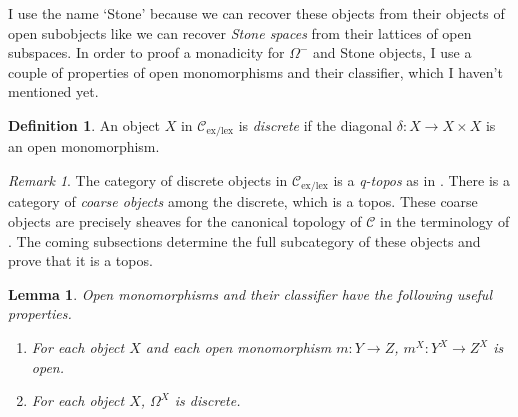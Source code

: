 \documentclass[sort&compress]{elsarticle}
\theoremstyle{plain}
\newtheorem{lemma}[theorem]{Lemma}
\theoremstyle{definition}
\newtheorem{defin}[theorem]{Definition}
\theoremstyle{remark}
\newtheorem{remark}[theorem]{Remark}
\newcommand\cat\mathcal
\newcommand\exlex{_\mathrm{ex/lex}}\newcommand\exreg{_\mathrm{ex/reg}}
\begin{document}
I use the name `Stone' because we can recover these objects from their objects of open subobjects like we can recover \emph{Stone spaces} from their lattices of open subspaces.
In order to proof a monadicity for $\Omega^-$ and Stone objects, I use a couple of properties of open monomorphisms and their classifier, which I haven't mentioned yet.

\begin{defin} An object $X$ in $\cat C\exlex$ is \emph{discrete} if the diagonal $\delta:X\to X\times X$ is an open monomorphism. \end{defin}

\begin{remark} The category of discrete objects in $\cat C\exlex$ is a \emph{q-topos} as in \citet{a2CAotTtTC}. There is a category of \emph{coarse objects} among the discrete, which is a topos. These coarse objects are precisely sheaves for the canonical topology of $\cat C$ in the terminology of \citet{MR1870615}. The coming subsections determine the full subcategory of these objects and prove that it is a topos. \end{remark}

\begin{lemma} Open monomorphisms and their classifier have the following useful properties.
\begin{enumerate}
\item For each object $X$ and each open monomorphism $m:Y\to Z$, $m^X:Y^X \to Z^X$ is open.
\item For each object $X$, $\Omega^X$ is discrete.
\end{enumerate}\label{compactdiscrete}
\end{lemma}
\end{document}
